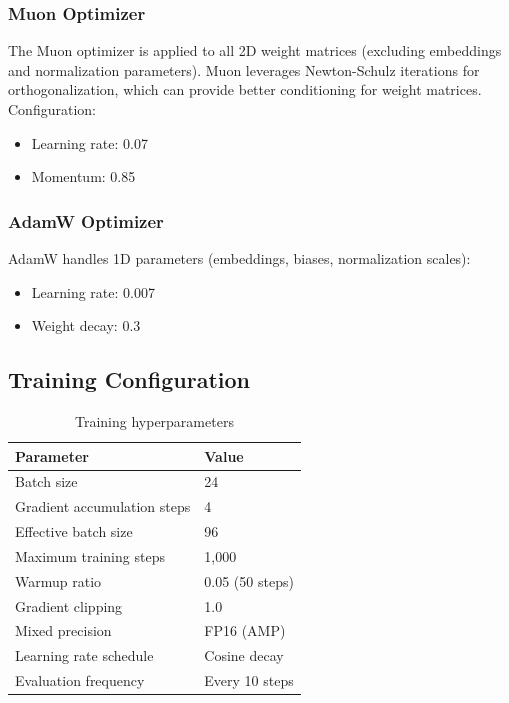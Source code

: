 \documentclass[11pt,a4paper]{article}
\begin{document}
\subsubsection{Muon Optimizer}

The Muon optimizer is applied to all 2D weight matrices (excluding embeddings and normalization parameters). Muon leverages Newton-Schulz iterations for orthogonalization, which can provide better conditioning for weight matrices. Configuration:

\begin{itemize}
    \item Learning rate: 0.07
    \item Momentum: 0.85
\end{itemize}

\subsubsection{AdamW Optimizer}

AdamW handles 1D parameters (embeddings, biases, normalization scales):

\begin{itemize}
    \item Learning rate: 0.007
    \item Weight decay: 0.3
\end{itemize}

\subsection{Training Configuration}

\begin{table}[h]
\centering
\begin{tabular}{@{}ll@{}}
\toprule
\textbf{Parameter} & \textbf{Value} \\
\midrule
Batch size & 24 \\
Gradient accumulation steps & 4 \\
Effective batch size & 96 \\
Maximum training steps & 1,000 \\
Warmup ratio & 0.05 (50 steps) \\
Gradient clipping & 1.0 \\
Mixed precision & FP16 (AMP) \\
Learning rate schedule & Cosine decay \\
Evaluation frequency & Every 10 steps \\
\bottomrule
\end{tabular}
\caption{Training hyperparameters}
\label{tab:training}
\end{table}
\end{document}

